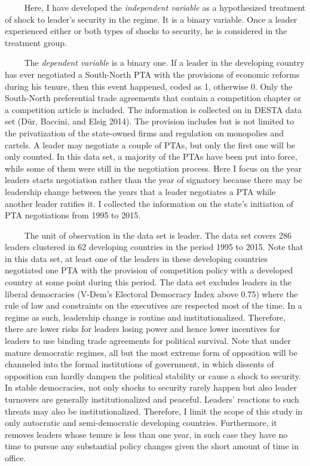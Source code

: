 \documentclass[12pt,]{article}
\begin{document}
\(\qquad\) Here, I have developed the \emph{independent variable} as a
hypothesized treatment of shock to leader's security in the regime. It
is a binary variable. Once a leader experienced either or both types of
shocks to security, he is considered in the treatment group.

\(\qquad\) The \emph{dependent variable} is a binary one. If a leader in
the developing country has ever negotiated a South-North PTA with the
provisions of economic reforms during his tenure, then this event
happened, coded as 1, otherwise 0. Only the South-North preferential
trade agreements that contain a competition chapter or a competition
article is included. The information is collected on in DESTA data set
(Dür, Baccini, and Elsig 2014). The provision includes but is not
limited to the privatization of the state-owned firms and regulation on
monopolies and cartels. A leader may negotiate a couple of PTAs, but
only the first one will be only counted. In this data set, a majority of
the PTAs have been put into force, while some of them were still in the
negotiation process. Here I focus on the year leaders starts negotiation
rather than the year of signatory because there may be leadership change
between the years that a leader negotiates a PTA while another leader
ratifies it. I collected the information on the state's initiation of
PTA negotiations from 1995 to 2015.

\(\qquad\) The unit of observation in the data set is leader. The data
set covers 286 leaders clustered in 62 developing countries in the
period 1995 to 2015. Note that in this data set, at least one of the
leaders in these developing countries negotiated one PTA with the
provision of competition policy with a developed country at some point
during this period. The data set excludes leaders in the liberal
democracies (V-Dem's Electoral Democracy Index above 0.75) where the
rule of law and constraints on the executives are respected most of the
time. In a regime as such, leadership change is routine and
institutionalized. Therefore, there are lower risks for leaders losing
power and hence lower incentives for leaders to use binding trade
agreements for political survival. Note that under mature democratic
regimes, all but the most extreme form of opposition will be channeled
into the formal institutions of government, in which dissents of
opposition can hardly dampen the political stability or cause a shock to
security. In stable democracies, not only shocks to security rarely
happen but also leader turnovers are generally institutionalized and
peaceful. Leaders' reactions to such threats may also be
institutionalized. Therefore, I limit the scope of this study in only
autocratic and semi-democratic developing countries. Furthermore, it
removes leaders whose tenure is less than one year, in such case they
have no time to pursue any substantial policy changes given the short
amount of time in office.
\end{document}
